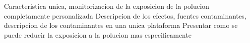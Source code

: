 \begin{itemize}
    \done Caracteristica unica, monitorizacion de la exposicion de la polucion completamente personalizada
    \done Descripcion de los efectos, fuentes contaminantes, descripcion de los contaminantes en una unica plataforma
    \crossed Presentar como se puede reducir la exposicion a la polucion mas especificamente
    
\end{itemize}
\newpage